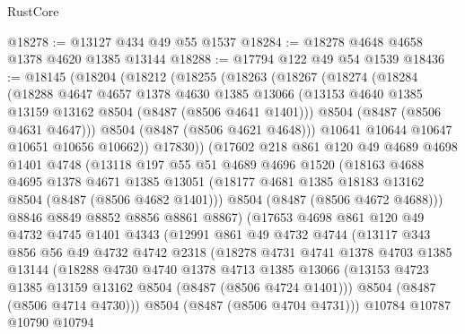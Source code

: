 \begin{lexlean}{RustCore}
\begin{coremodule}
@18278 := @13127 @434 @49 @55 @1537
@18284 := @18278 @4648 @4658 @1378 @4620 @1385 @13144
@18288 := @17794 @122 @49 @54 @1539
@18436 := @18145
    (@18204
      (@18212
        (@18255
          (@18263
            (@18267
              (@18274
                (@18284
                  (@18288
                    @4647
                    @4657
                    @1378
                    @4630
                    @1385
                    @13066
                    (@13153 @4640 @1385 @13159 @13162 @8504 (@8487 (@8506 @4641 @1401)))
                    @8504
                    (@8487 (@8506 @4631 @4647)))
                  @8504
                  (@8487 (@8506 @4621 @4648)))
                @10641
                @10644
                @10647
                @10651
                @10656
                @10662))
            @17830))
        (@17602
          @218
          @861
          @120
          @49
          @4689
          @4698
          @1401
          @4748
          (@13118
            @197
            @55
            @51
            @4689
            @4696
            @1520
            (@18163
              @4688
              @4695
              @1378
              @4671
              @1385
              @13051
              (@18177 @4681 @1385 @18183 @13162 @8504 (@8487 (@8506 @4682 @1401)))
              @8504
              (@8487 (@8506 @4672 @4688)))
            @8846
            @8849
            @8852
            @8856
            @8861
            @8867)
          (@17653
            @4698
            @861
            @120
            @49
            @4732
            @4745
            @1401
            @4343
            (@12991
              @861
              @49
              @4732
              @4744
              (@13117
                @343
                @856
                @56
                @49
                @4732
                @4742
                @2318
                (@18278
                  @4731
                  @4741
                  @1378
                  @4703
                  @1385
                  @13144
                  (@18288
                    @4730
                    @4740
                    @1378
                    @4713
                    @1385
                    @13066
                    (@13153 @4723 @1385 @13159 @13162 @8504 (@8487 (@8506 @4724 @1401)))
                    @8504
                    (@8487 (@8506 @4714 @4730)))
                  @8504
                  (@8487 (@8506 @4704 @4731)))
                @10784
                @10787
                @10790
                @10794

\end{coremodule}
\end{lexlean}
